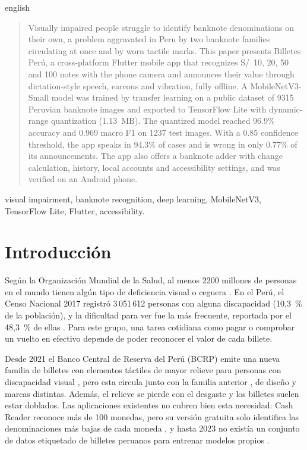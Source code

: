 \documentclass[conference,a4paper]{IEEEtran}
\renewcommand{\IEEEkeywordsname}{Palabras clave}
\begin{document}
{\renewcommand{\abstractname}{Abstract}\renewcommand{\IEEEkeywordsname}{Index Terms}
\begin{otherlanguage*}{english}
\begin{abstract}
Visually impaired people struggle to identify banknote denominations on their own, a problem aggravated in Peru by two banknote families circulating at once and by worn tactile marks. This paper presents Billetes Perú, a cross-platform Flutter mobile app that recognizes S/~10, 20, 50 and 100 notes with the phone camera and announces their value through dictation-style speech, earcons and vibration, fully offline. A MobileNetV3-Small model was trained by transfer learning on a public dataset of 9315 Peruvian banknote images and exported to TensorFlow Lite with dynamic-range quantization (1.13~MB). The quantized model reached 96.9\% accuracy and 0.969 macro F1 on 1237 test images. With a 0.85 confidence threshold, the app speaks in 94.3\% of cases and is wrong in only 0.77\% of its announcements. The app also offers a banknote adder with change calculation, history, local accounts and accessibility settings, and was verified on an Android phone.
\end{abstract}
\begin{IEEEkeywords}
visual impairment, banknote recognition, deep learning, MobileNetV3, TensorFlow Lite, Flutter, accessibility.
\end{IEEEkeywords}
\end{otherlanguage*}}

\section{Introducción}

Según la Organización Mundial de la Salud, al menos 2200 millones de personas en el mundo tienen algún tipo de deficiencia visual o ceguera \cite{who2019}. En el Perú, el Censo Nacional 2017 registró 3\,051\,612 personas con alguna discapacidad (10,3~\% de la población), y la dificultad para ver fue la más frecuente, reportada por el 48,3~\% de ellas \cite{inei2019}. Para este grupo, una tarea cotidiana como pagar o comprobar un vuelto en efectivo depende de poder reconocer el valor de cada billete.

Desde 2021 el Banco Central de Reserva del Perú (BCRP) emite una nueva familia de billetes con elementos táctiles de mayor relieve para personas con discapacidad visual \cite{bcrp2021}, pero esta circula junto con la familia anterior \cite{caytuiro2023}, de diseño y marcas distintas. Además, el relieve se pierde con el desgaste y los billetes suelen estar doblados. Las aplicaciones existentes no cubren bien esta necesidad: Cash Reader reconoce más de 100 monedas, pero su versión gratuita solo identifica las denominaciones más bajas de cada moneda \cite{cashreader}, y hasta 2023 no existía un conjunto de datos etiquetado de billetes peruanos para entrenar modelos propios \cite{caytuiro2023}.
\end{document}
